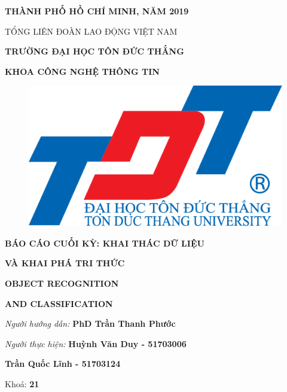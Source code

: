 \documentclass{report}
\begin{document}
\vspace{1.5cm}
\changefontsizes{14pt}
\centerline{\textbf{THÀNH PHỐ HỒ CHÍ MINH, NĂM 2019}}

\newpage
\changefontsizes[14pt]{12pt}
\centerline{TỔNG LIÊN ĐOÀN LAO ĐỘNG VIỆT NAM}

\changefontsizes[14pt]{11pt}
\centerline{\textbf{TRƯỜNG ĐẠI HỌC TÔN ĐỨC THẮNG}}
\centerline{\textbf{KHOA CÔNG NGHỆ THÔNG TIN}}

\begin{center}
	\begin{figure}[htp]
		\begin{center}
			\includegraphics[scale=.2]{logo}
		\end{center}
	\end{figure}
\end{center}

\changefontsizes{16pt}
\centerline{\textbf{BÁO CÁO CUỐI KỲ: KHAI THÁC DỮ LIỆU}}

\centerline{\textbf{VÀ KHAI PHÁ TRI THỨC}}
\vspace{1.5cm}
\changefontsizes{24pt}
\centerline{\textbf{OBJECT RECOGNITION}}

\centerline{\textbf{AND CLASSIFICATION}}

\vspace{3.5cm}
\begin{flushright}
	\renewcommand{\baselinestretch}{0.05}
	\changefontsizes{14pt}
	\textit{Người hướng dẫn: }\textbf{PhD Trần Thanh Phước}
	\setlength{\parskip}{0.5em}
	
	\textit{Người thực hiện: }\textbf{Huỳnh Văn Duy - 51703006}
	
	\textbf{Trần Quốc Lĩnh - 51703124}
	\setlength{\parskip}{0.5em}
	
	
	Khoá: \textbf{21}
	\setlength{\parskip}{0.5em}
	
\end{flushright}
\end{document}
